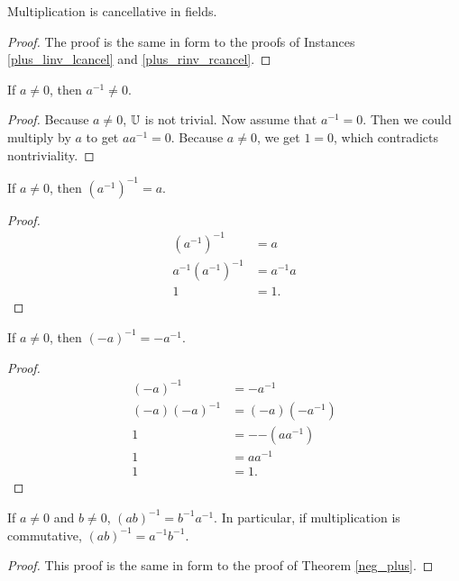 \documentclass[../../math.tex]{subfiles}
\begin{document}
\begin{instance}
    Multiplication is cancellative in fields.
\end{instance}
\begin{proof}
    The proof is the same in form to the proofs of Instances
    \ref{plus_linv_lcancel} and \ref{plus_rinv_rcancel}.
\end{proof}

\begin{theorem}
    If $a \neq 0$, then $a^{-1} \neq 0$.
\end{theorem}
\begin{proof}
    Because $a \neq 0$, $\mathbb{U}$ is not trivial.  Now assume that $a^{-1} = 0$.
    Then we could multiply by $a$ to get $aa^{-1} = 0$.  Because $a \neq 0$, we
    get $1 = 0$, which contradicts nontriviality.
\end{proof}

\begin{theorem}
    If $a \neq 0$, then $(a^{-1})^{-1} = a$.
\end{theorem}
\begin{proof}
    \begin{align*}
        (a^{-1})^{-1} &= a \\
        a^{-1} (a^{-1})^{-1} &= a^{-1} a \\
        1 &= 1.
    \end{align*}
\end{proof}

\begin{theorem}
    If $a \neq 0$, then $(-a)^{-1} = -a^{-1}$.
\end{theorem}
\begin{proof}
    \begin{align*}
        (-a)^{-1} &= -a^{-1} \\
        (-a)(-a)^{-1} &= (-a)(-a^{-1}) \\
        1 &= -{-(aa^{-1})} \\
        1 &= aa^{-1} \\
        1 &= 1.
    \end{align*}
\end{proof}

\begin{theorem}
    If $a \neq 0$ and $b \neq 0$, $(ab)^{-1} = b^{-1}a^{-1}$.  In particular, if
    multiplication is commutative, $(ab)^{-1} = a^{-1}b^{-1}$.
\end{theorem}
\begin{proof}
    This proof is the same in form to the proof of Theorem \ref{neg_plus}.
\end{proof}
\end{document}
